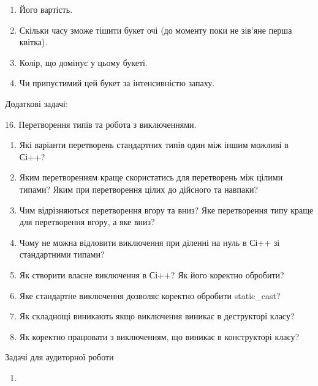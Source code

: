 \documentclass[]{article}
\makeatletter
\newcommand{\xslalph}[1]{\expandafter\@xslalph\csname c@#1\endcsname}
\newcommand{\@xslalph}[1]{%
    \ifcase#1\or а\or б\or в\or г\or д\or e\or є\or ж\or з\or i%
    \or й\or к\or л\or м\or н\or о\or п\or р\or с\or т%
    \or у\or ф\or х\or ц\or ч\or ш\or ю\or я\or аа\or бб\or вв%
    \else\@ctrerr\fi%
}
\makeatother
\begin{document}
\begin{enumerate}
\begin{enumerate}[label=\xslalph*)]
\begin{enumerate}
\begin{enumerate}[label=\xslalph*)]
\begin{enumerate}
\begin{enumerate}[label=\xslalph*)]
\begin{enumerate}
\begin{enumerate}[label=\xslalph*)]
\begin{enumerate}
\def\labelenumi{\arabic{enumi}.}
\item
  Його вартість.
\item
  Скільки часу зможе тішити букет очі (до моменту поки не зів'яне перша
  квітка).
\item
  Колір, що домінує у цьому букеті.
\item
  Чи припустимий цей букет за інтенсивністю запаху.
\end{enumerate}

Додаткові задачі:

16. Перетворення типів та робота з виключеннями.

\begin{enumerate}
\def\labelenumi{\arabic{enumi})}
\item
  Які варіанти перетворень стандартних типів один між іншим можливі в
  Сі++?
\item
  Яким перетворенням краще скористатись для перетворень між цілими
  типами? Яким при перетворення цілих до дійсного та навпаки?
\item
  Чим відрізняються перетворення вгору та вниз? Яке перетворення типу
  краще для перетворення вгору, а яке вниз?
\item
  Чому не можна відловити виключення при діленні на нуль в Сі++ зі
  стандартними типами?
\item
  Як створити власне виключення в Сі++? Як його коректно обробити?
\item
  Яке стандартне виключення дозволяє коректно обробити static\_cast?
\item
  Як складнощі виникають якщо виключення виникає в деструкторі класу?
\item
  Як коректно працювати з виключенням, що виникає в конструкторі класу?
\end{enumerate}

Задачі для аудиторної роботи

\begin{enumerate}
\def\labelenumi{\arabic{enumi})}
\item
\end{enumerate}


\end{enumerate}
\end{enumerate}
\end{enumerate}
\end{enumerate}
\end{enumerate}
\end{enumerate}
\end{enumerate}
\end{enumerate}
\end{document}
